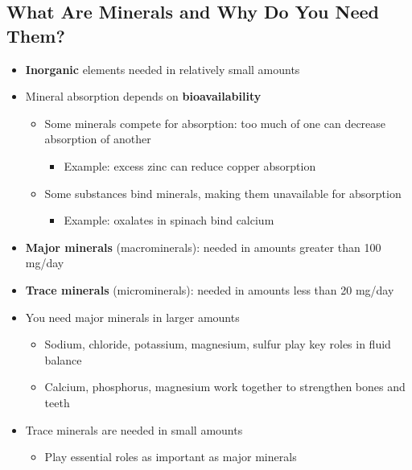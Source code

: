 \documentclass[12pt]{article}
\begin{document}
        \subsection{What Are Minerals and Why Do You Need Them?}
            \begin{itemize}
                \item \textbf{Inorganic} elements needed in relatively small amounts
                \item Mineral absorption depends on \textbf{bioavailability}
                    \begin{itemize}
                        \item Some minerals compete for absorption: too much of one can decrease absorption of another
                            \begin{itemize}
                                \item Example: excess zinc can reduce copper absorption
                            \end{itemize}
                        \item Some substances bind minerals, making them unavailable for absorption
                            \begin{itemize}
                                \item Example: oxalates in spinach bind calcium
                            \end{itemize}
                    \end{itemize}
                \item \textbf{Major minerals} (macrominerals): needed in amounts greater than 100 mg/day
                \item \textbf{Trace minerals} (microminerals): needed in amounts less than 20 mg/day
                \item You need major minerals in larger amounts
                    \begin{itemize}
                        \item Sodium, chloride, potassium, magnesium, sulfur play key roles in fluid balance
                        \item Calcium, phosphorus, magnesium work together to strengthen bones and teeth
                    \end{itemize}
                \item Trace minerals are needed in small amounts
                    \begin{itemize}
                        \item Play essential roles as important as major minerals

\end{itemize}
\end{itemize}
\end{document}
